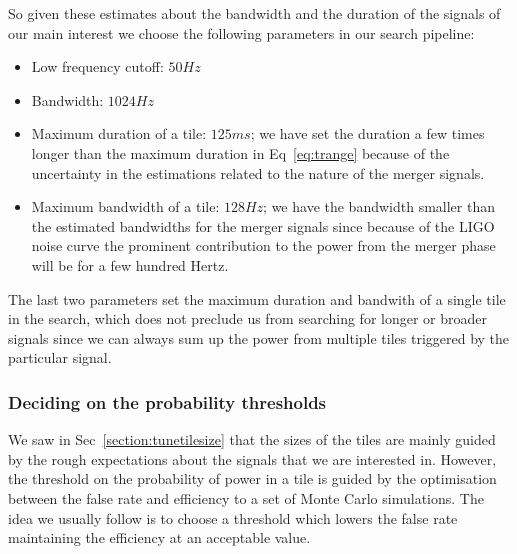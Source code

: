 So given these estimates about the bandwidth and the duration of the 
signals of our main interest we choose the following parameters in our
search pipeline:
\begin{itemize}
\item Low frequency cutoff: $50 Hz$
\item Bandwidth: $1024 Hz$
\item Maximum duration of a tile: $125 ms$; we have set the duration 
a few times longer than the maximum duration in Eq~\ref{eq:trange}
because of the uncertainty in the estimations related to the nature 
of the merger signals.
\item Maximum bandwidth of a tile: $128 Hz$; we have the bandwidth 
smaller than the estimated bandwidths for the merger signals since
because of the LIGO noise curve the prominent contribution to the 
power from the merger phase will be for a few hundred Hertz.
\end{itemize}
The last two parameters set the maximum duration and bandwith of 
a single tile in the search,  which does not preclude us from searching
for longer or broader signals since we can always sum up the power
from multiple tiles triggered by the particular signal. 
    
\subsubsection{Deciding on the probability thresholds}
\label{section:tunethreshold}
We saw in Sec~\ref{section:tunetilesize} that the sizes of the tiles
are mainly guided by the rough expectations about the signals that 
we are interested in.  However, the threshold on the probability
of power in a tile is guided by the optimisation between the false 
rate and efficiency to a set of Monte Carlo simulations.  The idea
we usually follow is to choose a threshold which lowers the false rate 
maintaining the efficiency at an acceptable value.

